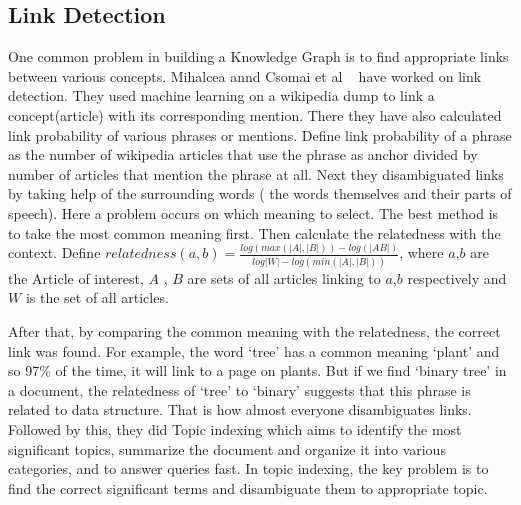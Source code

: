 \subsection{Link Detection}
One common problem in building a Knowledge Graph is to find appropriate links between various 
concepts. Mihalcea annd Csomai et al ~\cite{ref3LinkWikipedia} have worked on link detection. They used 
machine learning on a wikipedia dump to link a concept(article) with its corresponding mention. 
There they have also calculated 
link probability of various phrases or mentions. Define link probability of a phrase as the 
number of wikipedia articles that use the phrase as anchor divided by  number of articles that mention the phrase at all.
Next they disambiguated links by taking help of the surrounding words 
( the words themselves and their parts of speech). Here a problem occurs on which meaning to select.
The best method is to take the most common meaning first. Then calculate the relatedness
with the context. Define $ relatedness(a,b) = \frac{log(max(|A|, |B|)) - log(|AB|)}{log|W|-log(min(|A|, |B|))} $,
where $a$,$b$ are the Article of interest, $A$ , $B$ are sets of all articles linking to $a$,$b$ respectively and $W$ 
is the set of all articles.

After that, by comparing 
the  common meaning with the relatedness, the correct link was found. 
For example, the word `tree' has a common meaning `plant' and so 97\% of the time, it will link to a page on plants.
But if we find `binary tree' in a document, the relatedness of `tree' to `binary' suggests that this
phrase is related to data structure. That is how almost everyone disambiguates links. Followed by this, they 
did Topic indexing which aims to identify the most significant topics, summarize the document and organize it 
into various categories, and to answer queries fast. In topic indexing, the key problem is to find the correct significant 
terms and disambiguate them to appropriate topic.   



